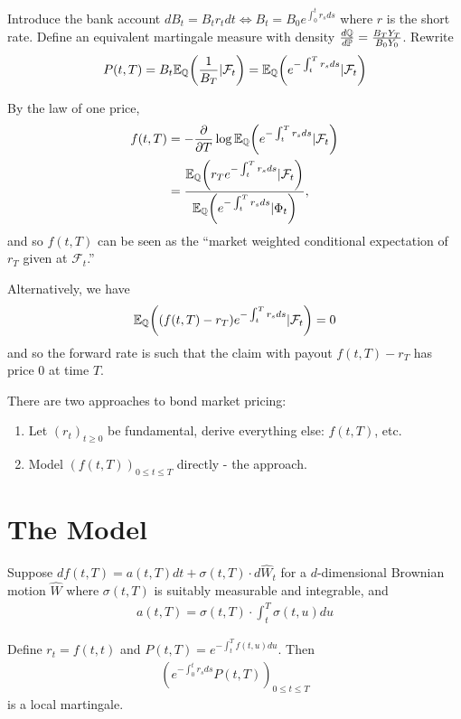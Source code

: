 Introduce the bank account $dB_{t} = B_{t} r_{t} dt \iff B_{t} = B_{0}
e^{\int_{0}^{t}r_{s} ds}$ where $r$ is the short rate.  Define an
equivalent martingale measure with density $\frac{d\Q}{d\Prob} =
\frac{B_{T} Y_{T}}{B_{0} Y_{0}}$.  Rewrite
\begin{align}
  \label{eq:149}
  P(t, T) = B_{t} \E{\frac{1}{B_{T}} | \mathcal{F}_{t}}{\Q} =
  \E{e^{-\int_{t}^{T} r_{s} ds} | \mathcal{F}_{t}}{\Q}
\end{align}

By the law of one price,
\begin{align}
  \label{eq:150}
  f(t, T) &= - \frac{\partial}{\partial T} \log \E{ e^{-\int_{t}^{T}
      r_{s} ds} | \mathcal{F}_{t}}{\Q} \\
  &= \frac{\E{r_{T} e^{-\int_{t}^{T} r_{s} ds} |
      \mathcal{F}_{t}}{\Q}}{\E{e^{-\int_{t}^{T} r_{s} ds} |
      \Phi_{t}}{\Q}},
\end{align} and so $f(t, T)$ can be seen as the ``market weighted
conditional expectation of $r_{T}$ given at $\mathcal{F}_{t}$.''

Alternatively, we have
\begin{align}
  \label{eq:151}
  \E{(f(t, T) - r_{T}) e^{-\int_{t}^{T} r_{s} ds} |
    \mathcal{F}_{t}}{\Q} = 0
\end{align} and so the forward rate is such that the claim with payout
$f(t, T) - r_{T}$ has price 0 at time $T$.


There are two approaches to bond market pricing:

\begin{enumerate}
\item Let $(r_{t})_{t \geq 0}$ be fundamental, derive everything else:
  $f(t, T)$, etc.
\item Model $(f(t, T))_{0 \leq t \leq T}$ directly - the
  \citet{heath1992bond} approach.
\end{enumerate}

\section{The \citet{heath1992bond} Model}
\label{sec:citetheath1992bond}

\begin{thm}
  \label{defn:bond_markets:7}
  Suppose $df(t, T) = a(t, T) dt + \sigma(t, T) \cdot d\hat W_{t}$ for
  a $d$-dimensional Brownian motion $\hat W$ where $\sigma(t, T)$ is
  suitably measurable and integrable, and
  \begin{align}
    \label{eq:76}
    a(t, T) = \sigma(t, T) \cdot \int_{t}^{T} \sigma(t, u) du
  \end{align}

  Define $r_{t} = f(t, t)$ and $P(t, T) = e^{-\int_{t}^{T} f(t, u)
    du}$. Then
  \begin{align}
    \label{eq:157}
    \left( e^{-\int_{0}^{t} r_{s} ds} P(t, T) \right)_{0 \leq t \leq T}
  \end{align} is a local martingale.
\end{thm}



